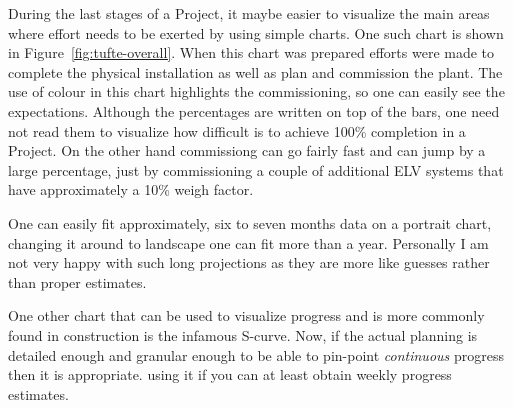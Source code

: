 During the last stages of a Project, it maybe easier to visualize the
main areas where effort needs to be exerted by using simple charts. One
such chart is shown in Figure~\ref{fig:tufte-overall}. When this chart
was prepared efforts were made to complete the physical installation
as well as plan and commission the plant. The use of colour in this
chart highlights the commissioning, so one can easily see the expectations. Although the percentages are written on top of the bars,
one need not read them to visualize how difficult is to achieve
100\% completion in a Project. On the other hand commissiong can go
fairly fast and can jump by a large percentage, just by
commissioning a couple of additional ELV systems that have approximately
a 10\% weigh factor.

One can easily fit approximately, six to seven months data on
a portrait chart, changing it around to landscape one can fit
more than a year. Personally I am not very happy with such long
projections as they are more like guesses rather than proper estimates.

One other chart that can be used to visualize progress and is more
commonly found in construction is the infamous S-curve. Now, if
the actual planning is detailed enough and granular enough to be
able to pin-point \textit{continuous} progress then it is
appropriate. using it if you can at least obtain weekly progress
estimates.


